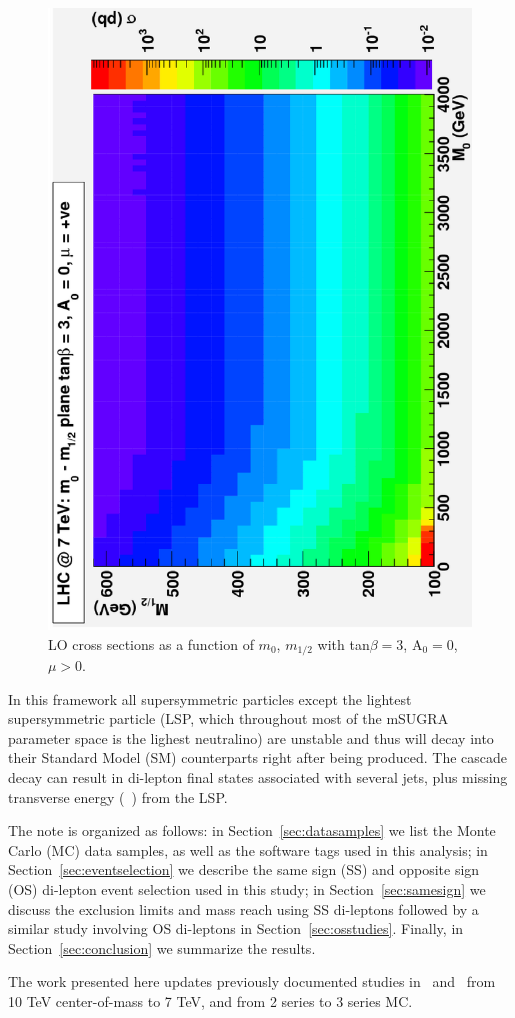 \vspace{3 mm}
\begin{figure}[htb]
\begin{center}
\includegraphics[angle=-90,width=0.6\linewidth]{figs/tanb3.ps}
\caption{LO cross sections as a function of $m_{0}$, $m_{1/2}$
with tan$\beta = 3$, A$_0 = 0$, $\mu > 0$. \label{fig:tanb3_lo}}
\end{center}
\end{figure}

In this framework all supersymmetric particles except the
lightest supersymmetric particle (LSP, which throughout most of the
mSUGRA parameter space is the lighest neutralino) are unstable and
thus will decay into their Standard Model (SM) counterparts right after being
produced. The cascade decay can result in di-lepton final states
associated  with several jets, plus missing transverse energy (\met~)
from the LSP.  

The note is organized as follows: in Section~\ref{sec:datasamples} we
list the Monte Carlo (MC) data samples, as well as the  software tags used
in this analysis; in Section~\ref{sec:eventselection} we describe the
same sign (SS) and opposite sign (OS) di-lepton event selection used in
this study; in Section~\ref{sec:samesign} we discuss the exclusion limits 
and mass reach using SS di-leptons followed by a similar study involving OS
di-leptons in Section~\ref{sec:osstudies}. Finally, in 
Section~\ref{sec:conclusion} we summarize the results.  

The work presented here updates previously documented studies 
in~\cite{osnote} and~\cite{ssnote} from 10 TeV center-of-mass to 7 TeV, 
and from 2 series to 3 series MC.
 
 



